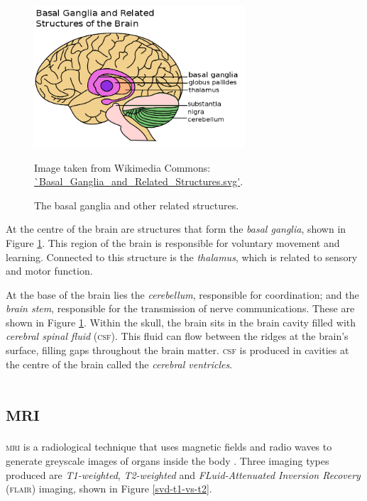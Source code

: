 \begin{figure}[ht]
	\centering
	\includegraphics[width=0.7\textwidth]{Images/2_Basal_Ganglia_and_Related_Structures.png}
	\caption{The basal ganglia and other related structures.}
	\small Image taken from Wikimedia Commons: \url{`Basal_Ganglia_and_Related_Structures.svg'}.
	\label{svd-basalfig}
\end{figure}

At the centre of the brain are structures that form the \textit{basal ganglia}, shown in Figure \ref{svd-basalfig}. This region of the brain is responsible for voluntary movement and learning. Connected to this structure is the \textit{thalamus}, which is related to sensory and motor function.

At the base of the brain lies the \textit{cerebellum}, responsible for coordination; and the \textit{brain stem}, responsible for the transmission of nerve communications. These are shown in Figure \ref{svd-basalfig}. Within the skull, the brain sits in the brain cavity filled with \textit{cerebral spinal fluid} (\textsc{csf}). This fluid can flow between the ridges at the brain's surface, filling gaps throughout the brain matter. \textsc{csf} is produced in cavities at the centre of the brain called the \textit{cerebral ventricles}.


\section{\textsc{mri}}\label{svd-MRI}

\textsc{mri} is a radiological technique that uses magnetic fields and radio waves to generate greyscale images of organs inside the body \citep{Rinck2013}. Three imaging types produced are \textit{T1-weighted}, \textit{T2-weighted} and \textit{FLuid-Attenuated Inversion Recovery} (\textsc{flair}) imaging, shown in Figure \ref{svd-t1-vs-t2}.

